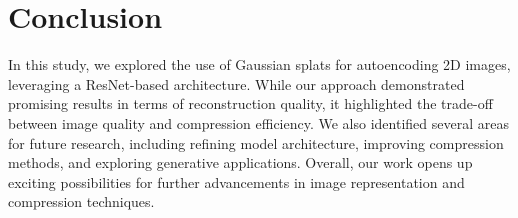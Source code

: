 \section{Conclusion}
\label{sec:conclusion}

In this study, we explored the use of Gaussian splats for autoencoding 2D images, leveraging a ResNet-based architecture. While our approach demonstrated promising results in terms of reconstruction quality, it highlighted the trade-off between image quality and compression efficiency. We also identified several areas for future research, including refining model architecture, improving compression methods, and exploring generative applications. Overall, our work opens up exciting possibilities for further advancements in image representation and compression techniques.
